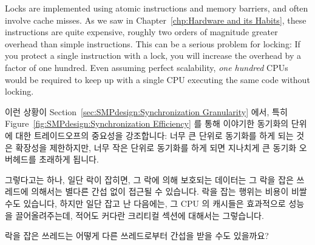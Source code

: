 Locks are implemented using atomic instructions and memory barriers,
and often involve cache misses.
As we saw in Chapter~\ref{chp:Hardware and its Habits},
these instructions are quite expensive, roughly two
orders of magnitude greater overhead than simple instructions.
This can be a serious problem for locking: If you protect a single
instruction with a lock, you will increase the overhead by a factor
of one hundred.
Even assuming perfect scalability, \emph{one hundred} CPUs would
be required to keep up with a single CPU executing the same code
without locking.
\fi

이런 상황이 Section~\ref{sec:SMPdesign:Synchronization Granularity} 에서, 특히
Figure~\ref{fig:SMPdesign:Synchronization Efficiency} 를 통해 이야기한 동기화의
단위에 대한 트레이드오프의 중요성을 강조합니다:
너무 큰 단위로 동기화를 하게 되는 것은 확장성을 제한하지만, 너무 작은 단위로
동기화를 하게 되면 지나치게 큰 동기화 오버헤드를 초래하게 됩니다.

그렇다고는 하나, 일단 락이 잡히면, 그 락에 의해 보호되는 데이터는 그 락을 잡은
쓰레드에 의해서는 별다른 간섭 없이 접근될 수 있습니다.
락을 잡는 행위는 비용이 비쌀 수도 있습니다, 하지만 일단 잡고 난 다음에는, 그
CPU 의 캐시들은 효과적으로 성능을 끌어올려주는데, 적어도 커다란 크리티컬 섹션에
대해서는 그렇습니다.

\QuickQuiz{}
	락을 잡은 쓰레드는 어떻게 다른 쓰레드로부터 간섭을 받을 수도 있을까요?
	\iffalse

